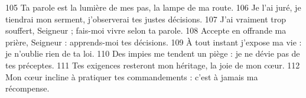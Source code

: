 105 Ta parole est la lumière de mes pas,
la lampe de ma route.
106 Je l’ai juré, je tiendrai mon serment,
j’observerai tes justes décisions.
107 J’ai vraiment trop souffert, Seigneur ;
fais-moi vivre selon ta parole.
108 Accepte en offrande ma prière, Seigneur :
apprends-moi tes décisions.
109 À tout instant j’expose ma vie :
je n’oublie rien de ta loi.
110 Des impies me tendent un piège :
je ne dévie pas de tes préceptes.
111 Tes exigences resteront mon héritage,
la joie de mon cœur.
112 Mon cœur incline à pratiquer tes commandements :
c’est à jamais ma récompense.